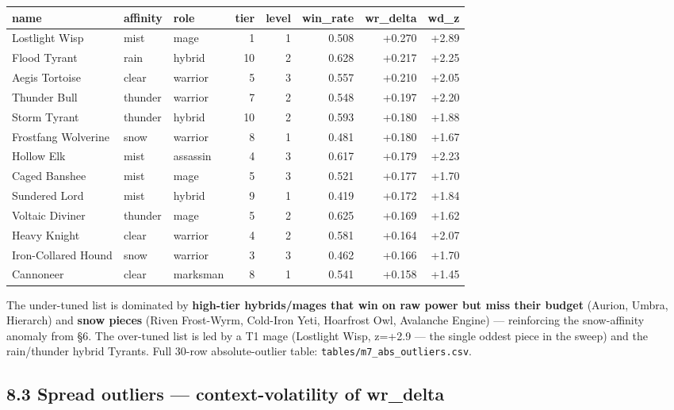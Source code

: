 \documentclass[10pt]{article}
\begin{document}
\medskip
\begin{tabularx}{\linewidth}{LLLrrrrr}
\toprule
\textbf{name} & \textbf{affinity} & \textbf{role} & \textbf{tier} & \textbf{level} & \textbf{win\_rate} & \textbf{wr\_delta} & \textbf{wd\_z} \\
\midrule
Lostlight Wisp & mist & mage & 1 & 1 & 0.508 & +0.270 & +2.89 \\
Flood Tyrant & rain & hybrid & 10 & 2 & 0.628 & +0.217 & +2.25 \\
Aegis Tortoise & clear & warrior & 5 & 3 & 0.557 & +0.210 & +2.05 \\
Thunder Bull & thunder & warrior & 7 & 2 & 0.548 & +0.197 & +2.20 \\
Storm Tyrant & thunder & hybrid & 10 & 2 & 0.593 & +0.180 & +1.88 \\
Frostfang Wolverine & snow & warrior & 8 & 1 & 0.481 & +0.180 & +1.67 \\
Hollow Elk & mist & assassin & 4 & 3 & 0.617 & +0.179 & +2.23 \\
Caged Banshee & mist & mage & 5 & 3 & 0.521 & +0.177 & +1.70 \\
Sundered Lord & mist & hybrid & 9 & 1 & 0.419 & +0.172 & +1.84 \\
Voltaic Diviner & thunder & mage & 5 & 2 & 0.625 & +0.169 & +1.62 \\
Heavy Knight & clear & warrior & 4 & 2 & 0.581 & +0.164 & +2.07 \\
Iron-Collared Hound & snow & warrior & 3 & 3 & 0.462 & +0.166 & +1.70 \\
Cannoneer & clear & marksman & 8 & 1 & 0.541 & +0.158 & +1.45 \\
\bottomrule
\end{tabularx}
\medskip

The under-tuned list is dominated by \textbf{high-tier hybrids/mages that win on raw power but miss their budget} (Aurion, Umbra, Hierarch) and \textbf{snow pieces} (Riven Frost-Wyrm, Cold-Iron Yeti, Hoarfrost Owl, Avalanche Engine) --- reinforcing the snow-affinity anomaly from \S{}6. The over-tuned list is led by a T1 mage (Lostlight Wisp, z=+2.9 --- the single oddest piece in the sweep) and the rain/thunder hybrid Tyrants. Full 30-row absolute-outlier table: \texttt{tables/\allowbreak{}m7\_\allowbreak{}abs\_\allowbreak{}outliers.\allowbreak{}csv}.\\

\subsection*{8.3 Spread outliers --- context-volatility of wr\_delta}
\end{document}
